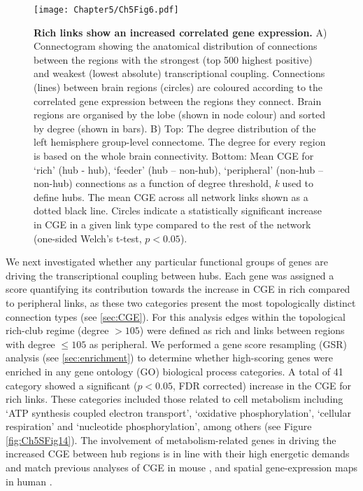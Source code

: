 \begin{figure}[h!]
\begin{center}
\texttt{[image: Chapter5/Ch5Fig6.pdf]}%
\end{center}
\caption{\textbf{Rich links show an increased correlated gene expression.} 
A) Connectogram showing the anatomical distribution of connections between the regions with the strongest (top 500 highest positive) and weakest (lowest absolute) transcriptional coupling. Connections (lines) between brain regions (circles) are coloured according to the correlated gene expression between the regions they connect. Brain regions are organised by the lobe (shown in node colour) and sorted by degree (shown in bars). B) Top: The degree distribution of the left hemisphere group-level connectome. The degree for every region is based on the whole brain connectivity. Bottom: Mean CGE for `rich' (hub - hub), `feeder' (hub – non-hub), `peripheral' (non-hub – non-hub) connections as a function of degree threshold, \textit{k} used to define hubs. The mean CGE across all network links shown as a dotted black line. Circles indicate a statistically significant increase in CGE in a given link type compared to the rest of the network (one-sided Welch's t-test, $p < 0.05$).}
\label{fig:Ch5Fig6}
\end{figure}

We next investigated whether any particular functional groups of genes are driving the transcriptional coupling between hubs. Each gene was assigned a score quantifying its contribution towards the increase in CGE in rich compared to peripheral links, as these two categories present the most topologically distinct connection types (see \ref{sec:CGE}). For this analysis edges within the topological rich-club regime (degree $> 105$) were defined as rich and links between regions with degree $\leq105$ as peripheral. We performed a gene score resampling (GSR) analysis (see \ref{sec:enrichment}) to determine whether high-scoring genes were enriched in any gene ontology (GO) biological process categories. A total of 41 category showed a significant ($p<0.05$, FDR corrected) increase in the CGE for rich links. These categories included those related to cell metabolism including `ATP synthesis coupled electron transport', `oxidative phosphorylation', `cellular respiration' and `nucleotide phosphorylation', among others (see Figure \ref{fig:Ch5SFig14}). The involvement of metabolism-related genes in driving the increased CGE between hub regions is in line with their high energetic demands \citep{Bullmore2012,Collin2014,Liang2013a,Tomasi2013} and match previous analyses of CGE in mouse \citep{Fulcher2016}, and spatial gene-expression maps in human \citep{Vertes2016b}.


